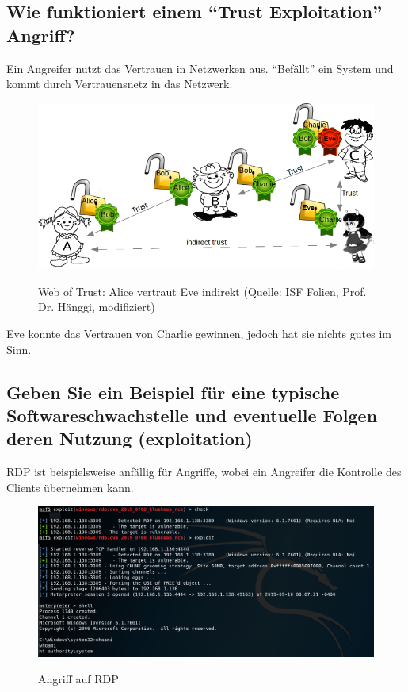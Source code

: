 \subsection*{Wie funktioniert einem "`Trust Exploitation"' Angriff?}
Ein Angreifer nutzt das Vertrauen in Netzwerken aus. "`Befällt"' ein System und kommt durch Vertrauensnetz in das Netzwerk.

\begin{figure}[H]
    \begin{center}
    \label{pic:WOT}
    \includegraphics[width=\textwidth]{images/WOT.png}
    \caption{Web of Trust: Alice vertraut Eve indirekt (Quelle: ISF Folien, Prof. Dr. Hänggi, modifiziert)}
    \end{center}
\end{figure}

Eve konnte das Vertrauen von Charlie gewinnen, jedoch hat sie nichts gutes im Sinn.

\subsection*{Geben Sie ein Beispiel für eine typische Softwareschwachstelle und eventuelle Folgen deren Nutzung (exploitation)}
RDP ist beispielsweise anfällig für Angriffe, wobei ein Angreifer die Kontrolle des Clients übernehmen kann.
\begin{figure}[H]
    \begin{center}
    \label{pic:RDPPenetration}
    \includegraphics[width=\textwidth]{images/targets-set.png}
    \caption[Angriff auf RDP]{Angriff auf RDP\footnotemark}
    \end{center}
\end{figure}

